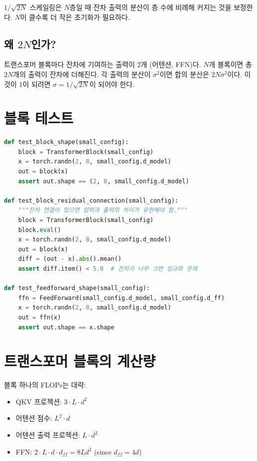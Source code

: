 $1/\sqrt{2N}$ 스케일링은 $N$층일 때 잔차 출력의 분산이 층 수에 비례해 커지는 것을 보정한다. $N$이 클수록 더 작은 초기화가 필요하다.

\subsection{왜 $2N$인가?}

트랜스포머 블록마다 잔차에 기여하는 출력이 2개 (어텐션, FFN)다. $N$개 블록이면 총 $2N$개의 출력이 잔차에 더해진다. 각 출력의 분산이 $\sigma^2$이면 합의 분산은 $2N \sigma^2$이다. 이것이 1이 되려면 $\sigma = 1/\sqrt{2N}$이 되어야 한다.

\section{블록 테스트}

\begin{lstlisting}[language=Python]
def test_block_shape(small_config):
    block = TransformerBlock(small_config)
    x = torch.randn(2, 8, small_config.d_model)
    out = block(x)
    assert out.shape == (2, 8, small_config.d_model)

def test_block_residual_connection(small_config):
    """잔차 연결이 있으면 입력과 출력의 차이가 유한해야 함."""
    block = TransformerBlock(small_config)
    block.eval()
    x = torch.randn(2, 8, small_config.d_model)
    out = block(x)
    diff = (out - x).abs().mean()
    assert diff.item() < 5.0  # 잔차가 너무 크면 정규화 문제

def test_feedforward_shape(small_config):
    ffn = FeedForward(small_config.d_model, small_config.d_ff)
    x = torch.randn(2, 8, small_config.d_model)
    out = ffn(x)
    assert out.shape == x.shape
\end{lstlisting}

\section{트랜스포머 블록의 계산량}

블록 하나의 FLOPs는 대략:
\begin{itemize}
  \item QKV 프로젝션: $3 \cdot L \cdot d^2$
  \item 어텐션 점수: $L^2 \cdot d$
  \item 어텐션 출력 프로젝션: $L \cdot d^2$
  \item FFN: $2 \cdot L \cdot d \cdot d_{ff} = 8 L d^2$ (since $d_{ff} = 4d$)
\end{itemize}

